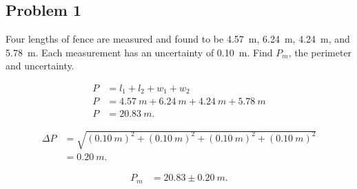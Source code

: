 

\subsection{Problem 1}

Four lengths of fence are measured and found to be \SI{4.57}{m}, \SI{6.24}{m}, \SI{4.24}{m}, and \SI{5.78}{m}. Each measurement has an uncertainty of \SI{0.10}{m}. Find $P_{m}$, the perimeter and uncertainty.

\begin{align*}
	P &= l_1 + l_2 + w_1 + w_2 \\
	P &= \SI{4.57}{m} + \SI{6.24}{m} + \SI{4.24}{m} + \SI{5.78}{m} \\
	P &= \SI{20.83}{m}
	.\end{align*}

\begin{align*}
	\Delta P &= \sqrt{\left( \SI{0.10}{m} \right)^2 + \left( \SI{0.10}{m} \right)^2 + \left( \SI{0.10}{m} \right)^2 + \left( \SI{0.10}{m} \right)^2} \\
	&= \SI{0.20}{m}
	.\end{align*}

\begin{align*}
	P_{m} &= 20.83 \pm \SI{0.20}{m}
	.\end{align*}
